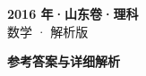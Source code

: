 \documentclass[zihao=-4, a4paper]{ctexart}
\begin{document}
\begin{center}
  {\Large\bfseries 2016 年·山东卷·理科}\\[4pt]
  {\large 数学 · 解析版}
\end{center}
\medskip
{}

\clearpage
{}
\begin{center}{\Large\bfseries 参考答案与详细解析}\end{center}
\medskip

\end{document}
